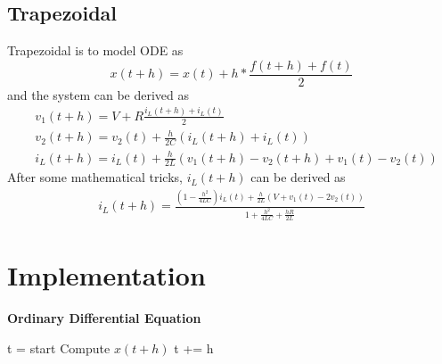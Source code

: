 \documentclass{article}
\begin{document}
\subsection{Trapezoidal}
Trapezoidal is to model ODE as 
$$
    x(t + h) = x(t) + h * \frac{f(t+h) + f(t)}{2}
$$
and the system can be derived as
\begin{align}
    & v_1(t+h) = V + R\frac{i_L(t+h) + i_L(t)}{2} \\
    & v_2(t+h) = v_2(t) + \frac{h}{2C}(i_L(t+h) + i_L(t)) \\
    & i_L(t+h) = i_L(t) + \frac{h}{2L}(v_1(t+h) - v_2(t+h) + v_1(t) - v_2(t))
\end{align}
After some mathematical tricks, $i_L(t+h)$ can be derived as
\begin{align}
    i_L(t+h) = \frac{(1-\frac{h^2}{4LC})i_L(t) + \frac{h}{2L}(V + v_1(t) - 2v_2(t))}{1 + \frac{h^2}{4LC} + \frac{hR}{2L}}
\end{align}

\section{Implementation}
\begin{algorithm}[H]
    \caption{\textbf{Ordinary Differential Equation}}
    \begin{algorithmic}
        \State t = start
            \State Compute $x(t+h)$
            \State t += h
        \EndWhile
    \end{algorithmic}
\end{algorithm}
\end{document}
